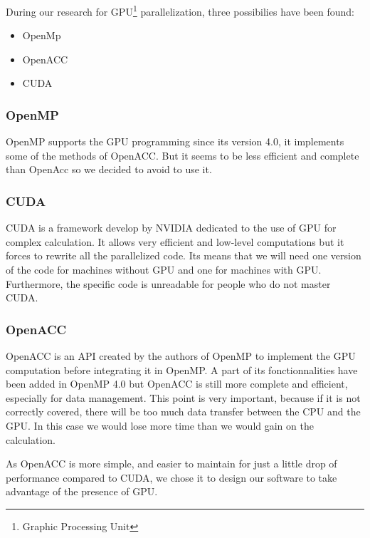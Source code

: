 During our research for GPU\footnote{Graphic Processing Unit} parallelization, three possibilies have been found:
\begin{itemize}
\item OpenMp
\item OpenACC
\item CUDA
\end{itemize}


\subsubsection{OpenMP}
OpenMP supports the GPU programming since its version 4.0, it implements some of the methods of OpenACC. But it seems to be less efficient and complete than OpenAcc so we decided to avoid to use it.

\subsubsection{CUDA}
CUDA is a framework develop by NVIDIA dedicated to the use of GPU for complex calculation. It allows very efficient and low-level computations but it forces to rewrite all the parallelized code. Its means that we will need one version of the code for machines without GPU and one for machines with GPU. Furthermore, the specific code is unreadable for people who do not master CUDA.

\subsubsection{OpenACC}
OpenACC is an API created by the authors of OpenMP to implement the GPU computation before integrating it in OpenMP. A part of its fonctionnalities have been added in OpenMP 4.0 but OpenACC is still more complete and efficient, especially for data management. This point is very important, because if it is not correctly covered, there will be too much data transfer between the CPU and the GPU. In this case we would lose more time than we would gain on the calculation. 

As OpenACC is more simple, and easier to maintain for just a little drop of performance compared to CUDA, we chose it to design our software to take advantage of the presence of GPU.